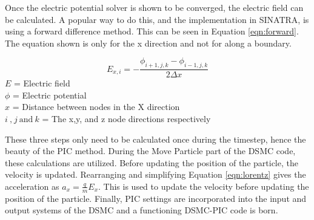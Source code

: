 \indent Once the electric potential solver is shown to be converged, the electric field can be calculated. A popular way to do this, and the implementation in SINATRA, is using a forward difference method. This can be seen in Equation \ref{eqn:forward}. The equation shown is only for the x direction and not for along a boundary. \par

\begin{equation}
    \label{eqn:forward}
    E_{x,i} = - \frac{\phi_{i+1,j,k} - \phi_{i-1,j,k}}{2 \Delta x}
\end{equation}
\(E\) = Electric field \\
\(\phi\) = Electric potential \\
\(x\) = Distance between nodes in the X direction \\
\(i \: \text{,} \: j \: \text{and} \: k\) = The x,y, and z node directions respectively  \par

\indent These three steps only need to be calculated once during the timestep, hence the beauty of the PIC method. During the Move Particle part of the DSMC code, these calculations are utilized. Before updating the position of the particle, the velocity is updated. Rearranging and simplifying Equation \ref{eqn:lorentz} gives the acceleration as \(a_x = \frac{q}{m} E_x\). This is used to update the velocity before updating the position of the particle. Finally, PIC settings are incorporated into the input and output systems of the DSMC and a functioning DSMC-PIC code is born. 








